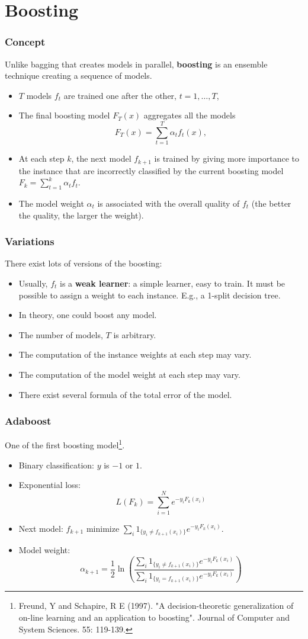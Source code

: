 \section{Boosting}
\begin{frame}
\frametitle{Concept}
Unlike bagging that creates models in parallel, {\bf boosting} is an ensemble technique creating a sequence of models. 
\begin{itemize}
\item $T$ models $f_t$ are trained one after the other, $t=1,\ldots,T$,
\item The final boosting model $F_T(x)$ aggregates all the models
$$
F_T(x) = \sum_{t=1}^T \alpha_t f_t(x),
$$
\item At each step $k$, the next model $f_{k+1}$ is trained by giving more importance to the instance that are incorrectly classified by the current boosting model $F_k=\sum_{t=1}^k \alpha_t f_t$.
\item The model weight $\alpha_t$ is associated with the overall quality of $f_t$ (the better the quality, the larger the weight).
\end{itemize} 
\end{frame}
\begin{frame}
\frametitle{Variations}
There exist lots of versions of the boosting:
\begin{itemize}
\item Usually, $f_t$ is a {\bf weak learner}: a simple learner, easy to train. It must be possible to assign a weight to each instance. E.g., a 1-split decision tree. 
\item In theory, one could boost any model.
\item The number of models, $T$ is arbitrary.
\item The computation of the instance weights at each step may vary.
\item The computation of the model weight at each step may vary.
\item There exist several formula of the total error of the model. 
\end{itemize} 
\end{frame}
\begin{frame}
\frametitle{Adaboost}
One of the first boosting model\footnote{Freund, Y and Schapire, R E (1997). "A decision-theoretic generalization of on-line learning and an application to boosting". Journal of Computer and System Sciences. 55: 119-139.}. 
\begin{itemize}
\item Binary classification: $y$ is $-1$ or $1$.
\item Exponential loss: 
$$
L(F_k) = \sum_{i=1}^N e^{-y_i F_k(x_i)}
$$
\item Next model: $f_{k+1}$ minimize $\sum_i 1_{\{y_i \neq f_{k+1}(x_i)\}} e^{-y_i F_{k}(x_i)}$.
\item Model weight: 
$$
\alpha_{k+1} = \frac{1}{2} \ln \left(\frac{\sum_i 1_{\{y_i \neq f_{k+1}(x_i)\}} e^{-y_i F_{k}(x_i)}}{\sum_i 1_{\{y_i = f_{k+1}(x_i)\}} e^{-y_i F_{k}(x_i)}}\right)
$$ 
\end{itemize}
\end{frame}
